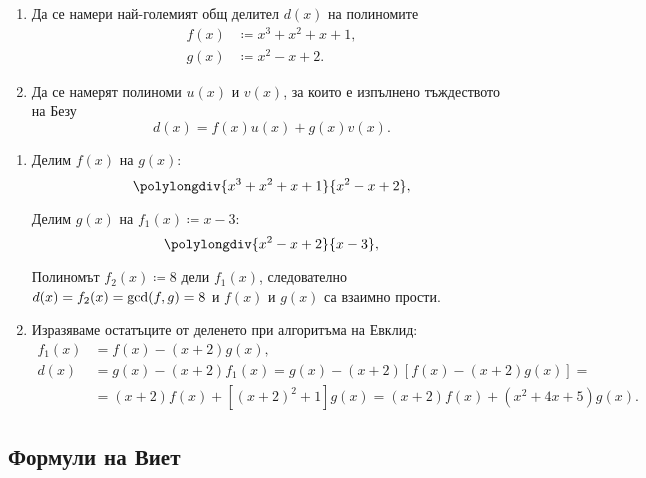 \documentclass[numbers=endperiod, DIV=15]{scrartcl}
\begin{document}
\begin{exercise}
  \mbox{}
  \begin{enumerate}
    \item Да се намери най-големият общ делител $d(x)$ на полиномите
    \begin{align*}
      f(x) &\coloneqq x^3 + x^2 + x + 1, \\
      g(x) &\coloneqq x^2 - x + 2.
    \end{align*}

    \item Да се намерят полиноми $u(x)$ и $v(x)$, за които е изпълнено тъждеството на Безу
    \begin{displaymath}
      d(x) = f(x) u(x) + g(x) v(x).
    \end{displaymath}
  \end{enumerate}
\end{exercise}
\begin{solution}
  \mbox{}
  \begin{enumerate}
    \item Делим $f(x)$ на $g(x)$:
    \begin{displaymath}
      \polylongdiv {x^3 + x^2 + x + 1} {x^2 - x + 2},
    \end{displaymath}

    Делим $g(x)$ на $f_1(x) \coloneqq x - 3$:
    \begin{displaymath}
      \polylongdiv {x^2 - x + 2} {x - 3},
    \end{displaymath}

    Полиномът $f_2(x) \coloneqq 8$ дели $f_1(x)$, следователно $d(x) = f_2(x) = \operatorname{gcd}(f, g) = 8$ и $f(x)$ и $g(x)$ са взаимно прости.

    \item Изразяваме остатъците от деленето при алгоритъма на Евклид:
    \begin{align*}
      f_1(x)
      &=
      f(x) - (x + 2) g(x),
      \\
      d(x)
      &=
      g(x) - (x + 2) f_1(x)
      =
      g(x) - (x + 2) [f(x) - (x + 2) g(x)]
      = \\ &=
      (x + 2) f(x) + [{(x + 2)}^2 + 1] g(x)
      =
      \boxed{(x + 2) f(x) + (x^2 + 4x + 5) g(x)}.
    \end{align*}
  \end{enumerate}
\end{solution}

\subsection{Формули на Виет}
\end{document}
